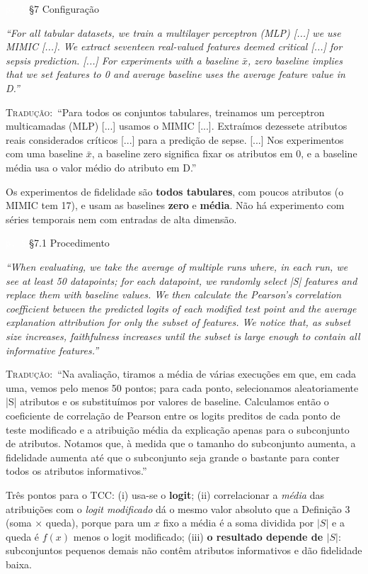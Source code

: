 \documentclass[11pt,a4paper]{article}
\newcommand{\pagechip}[1]{{\setlength{\fboxsep}{1.5pt}\colorbox{cAcc}{\textcolor{white}{\scriptsize\texttt{#1}}}}}
\newenvironment{origquote}{\par\itshape\small}{\par}
\newenvironment{tradquote}{\par\small\textsc{Tradução:}\ }{\par}
\newcommand{\explab}[1]{\par\smallskip{\small\color{cAcc}\textbf{\MakeUppercase{#1}}}\par}
\begin{document}
\begin{citacard}{\pagechip{p. 5} §7 Configuração}
\begin{origquote}“For all tabular datasets, we train a multilayer perceptron (MLP) [...] we use MIMIC [...]. We extract seventeen real-valued features deemed critical [...] for sepsis prediction. [...] For experiments with a baseline \ensuremath{\bar{x}}, zero baseline implies that we set features to 0 and average baseline uses the average feature value in D.”\end{origquote}
\begin{tradquote}“Para todos os conjuntos tabulares, treinamos um perceptron multicamadas (MLP) [...] usamos o MIMIC [...]. Extraímos dezessete atributos reais considerados críticos [...] para a predição de sepse. [...] Nos experimentos com uma baseline \ensuremath{\bar{x}}, a baseline zero significa fixar os atributos em 0, e a baseline média usa o valor médio do atributo em D.”\end{tradquote}
\explab{Explicação}
Os experimentos de fidelidade são \textbf{todos tabulares}, com poucos atributos (o MIMIC tem 17), e usam as baselines \textbf{zero} e \textbf{média}. Não há experimento com séries temporais nem com entradas de alta dimensão.
\end{citacard}

\begin{citacard}{\pagechip{p. 5} §7.1 Procedimento}
\begin{origquote}“When evaluating, we take the average of multiple runs where, in each run, we see at least 50 datapoints; for each datapoint, we randomly select |S| features and replace them with baseline values. We then calculate the Pearson’s correlation coefficient between the predicted logits of each modified test point and the average explanation attribution for only the subset of features. We notice that, as subset size increases, faithfulness increases until the subset is large enough to contain all informative features.”\end{origquote}
\begin{tradquote}“Na avaliação, tiramos a média de várias execuções em que, em cada uma, vemos pelo menos 50 pontos; para cada ponto, selecionamos aleatoriamente |S| atributos e os substituímos por valores de baseline. Calculamos então o coeficiente de correlação de Pearson entre os logits preditos de cada ponto de teste modificado e a atribuição média da explicação apenas para o subconjunto de atributos. Notamos que, à medida que o tamanho do subconjunto aumenta, a fidelidade aumenta até que o subconjunto seja grande o bastante para conter todos os atributos informativos.”\end{tradquote}
\explab{Explicação}
Três pontos para o TCC: (i) usa-se o \textbf{logit}; (ii) correlacionar a \textit{média} das atribuições com o \textit{logit modificado} dá o mesmo valor absoluto que a Definição 3 (soma × queda), porque para um $x$ fixo a média é a soma dividida por $|S|$ e a queda é $f(x)$ menos o logit modificado; (iii) \textbf{o resultado depende de $|S|$}: subconjuntos pequenos demais não contêm atributos informativos e dão fidelidade baixa.
\end{citacard}
\end{document}
